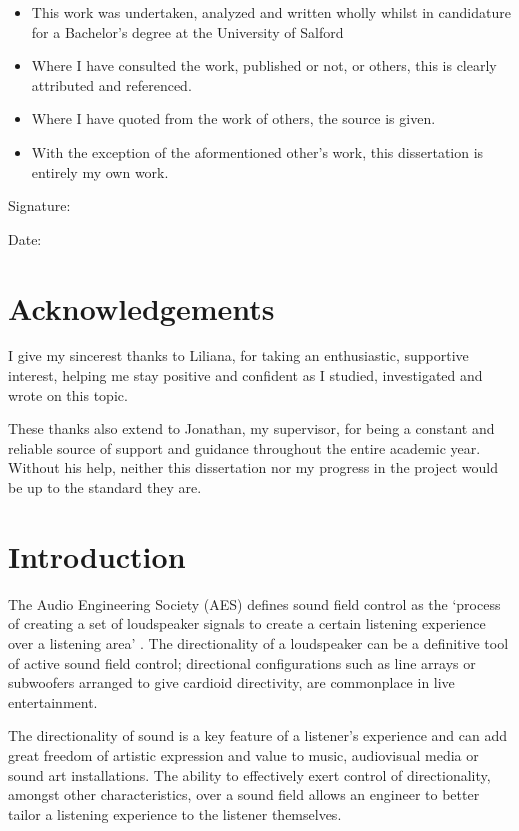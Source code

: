 \documentclass{report}
\begin{document}
    \begin{itemize}
        \item{This work was undertaken, analyzed and written wholly whilst in candidature for a Bachelor's degree at the University of Salford}
        \item{Where I have consulted the work, published or not, or others, this is clearly attributed and referenced.}
        \item{Where I have quoted from the work of others, the source is given.}
        \item{With the exception of the aformentioned other's work, this dissertation is entirely my own work.}
    \end{itemize}
    \vspace{5cm}

    Signature: \hrulefill

    \vspace{2cm}
    Date: \hrulefill

\chapter*{Acknowledgements}
    I give my sincerest thanks to Liliana, for taking an enthusiastic, supportive interest, helping me stay positive and confident as I studied, investigated and wrote on this topic.

    These thanks also extend to Jonathan, my supervisor, for being a constant and reliable source of support and guidance throughout the entire academic year.
    Without his help, neither this dissertation nor my progress in the project would be up to the standard they are.
\tableofcontents

\newpage
{}
\chapter{Introduction}
    The Audio Engineering Society (AES) defines sound field control as the `process of creating a set of loudspeaker signals to create a certain listening experience over a listening area' \cite{AESsoundfieldcontrol}.
    The directionality of a loudspeaker can be a definitive tool of active sound field control; directional configurations such as line arrays or subwoofers arranged to give cardioid directivity, are commonplace in live entertainment.

    The directionality of sound is a key feature of a listener's experience and can add great freedom of artistic expression and value to music, audiovisual media or sound art installations.
    The ability to effectively exert control of directionality, amongst other characteristics, over a sound field allows an engineer to better tailor a listening experience to the listener themselves.
    
\end{document}
